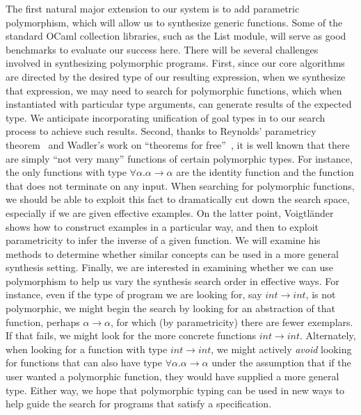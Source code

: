 The first natural major extension to our system is to add
parametric polymorphism, which will allow us to synthesize generic
functions.  Some of the standard OCaml collection libraries, such as
the List module, will serve as good benchmarks to evaluate our success
here.  There will be several challenges involved in synthesizing 
polymorphic programs.  First, since our core algorithms are directed by
the desired type of our resulting expression, when we synthesize 
that expression, we may need to search for polymorphic functions, which
when instantiated with particular type arguments, can generate results 
of the expected type.  
We anticipate incorporating unification of goal types in to our search
process to achieve such results.  Second, thanks to Reynolds' parametricy
theorem~\cite{reynolds:parametricity} and Wadler's work on ``theorems for free''~\cite{wadler:theorems-for-free}, it is well known that there are simply
``not very many'' functions of certain polymorphic types.  For instance,
the only functions with type $\forall \alpha. \alpha \rightarrow \alpha$
are the identity function and the function that does not terminate on
any input.  When searching for polymorphic functions, we should be able
to exploit this fact to dramatically cut down the search space, especially 
if we are given effective examples.  On the latter point, 
Voigtl\"{a}nder~\cite{voigtlander:bidirectionalization-for-free}
shows how to construct examples in a particular way, and then to exploit 
parametricity to infer
the inverse of a given function.  We will examine his methods to determine
whether similar concepts can be used in a more general synthesis setting.
Finally, we are interested in examining whether we can use polymorphism
to help us vary the synthesis search order in effective ways.
For instance, even if the type of program we are looking for, say 
$\mathit{int} \rightarrow \mathit{int}$, is not polymorphic, we might
begin the search by looking for an abstraction of that function, perhaps
$\alpha \rightarrow \alpha$, for which (by parametricity) there are fewer
exemplars.  If that fails, we might look for the more concrete
functions $\mathit{int} \rightarrow \mathit{int}$.  Alternately,
when looking for a function with type $\mathit{int} \rightarrow \mathit{int}$,
we might actively \emph{avoid} looking for functions that can also have type
$\forall\alpha.\alpha \rightarrow \alpha$ under the assumption that if the 
user wanted
a polymorphic function, they would have supplied a more general type.
Either way, we hope that polymorphic typing can be used in new ways
to help guide the search for programs that satisfy a specification.


